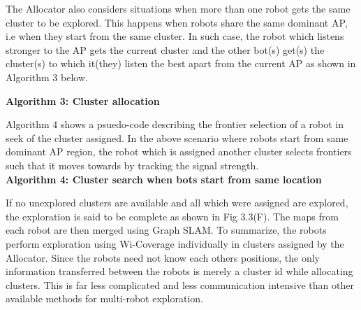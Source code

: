 \vspace{1.5em}

\par The Allocator also considers situations when more than one robot gets the same cluster to be explored. This happens when robots share the same dominant AP, i.e when they start from the same cluster. In such case, the robot which listens stronger to the AP gets the current cluster and the other bot(s) get(s) the cluster(s) to which it(they) listen the best apart from the current AP as shown in Algorithm 3 below.

\vspace{1.5em}

\noindent\textbf{Algorithm 3: Cluster allocation}

\begin{algorithm}[H]
\end{algorithm}

Algorithm 4 shows a psuedo-code describing the frontier selection of a robot in seek of the cluster assigned. In the above scenario where robots start from same dominant AP region, the robot which is assigned another cluster selects frontiers such that it moves towards by tracking the signal strength.\\

\noindent\textbf{Algorithm 4: Cluster search when bots start from same location}

\begin{algorithm}[H]
\end{algorithm}

If no unexplored clusters are available and all which were assigned are explored, the exploration is said to be complete as shown in Fig 3.3(F). The maps from each robot are then merged using Graph SLAM.
To summarize, the robots perform exploration using Wi-Coverage individually in clusters assigned by the Allocator. Since the robots need not know each others positions, the only information transferred between the robots is merely a cluster id while allocating clusters. This is far less complicated and less communication intensive than other available methods for multi-robot exploration.

